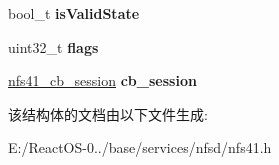 \begin{DoxyCompactItemize}
\mbox{\label{struct____nfs41__session_a868cbc9d62f7ee6b70297b2f7fc1f926}} 
bool\+\_\+t {\bfseries is\+Valid\+State}
\item 
\mbox{\label{struct____nfs41__session_afcdbb47d5009dfda2e90c178d0d9a098}} 
uint32\+\_\+t {\bfseries flags}
\item 
\mbox{\label{struct____nfs41__session_aa746824ffe79b1dff32b98f246a1eb9e}} 
\hyperlink{struct____nfs41__cb__session}{nfs41\+\_\+cb\+\_\+session} {\bfseries cb\+\_\+session}
\end{DoxyCompactItemize}


该结构体的文档由以下文件生成\+:\begin{DoxyCompactItemize}
\item 
E\+:/\+React\+O\+S-\/0../base/services/nfsd/nfs41.\+h\end{DoxyCompactItemize}
